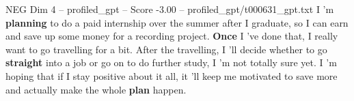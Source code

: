 \begin{textsample}{NEG Dim 4 – profiled\_gpt – Score -3.00 – profiled\_gpt/t000631\_gpt.txt}  \label{ex:f4_neg_004}
I ’m \textbf{planning} to do a paid internship over the summer after I graduate, so I can earn and save up some money for a recording project. \textbf{Once} I ’ve done that, I really want to go travelling for a bit.
After the travelling, I ’ll decide whether to go \textbf{straight} into a job or go on to do further study, I ’m not totally sure yet.
I ’m hoping that if I stay positive about it all, it ’ll keep me motivated to save more and actually make the whole \textbf{plan} happen.

\end{textsample}
